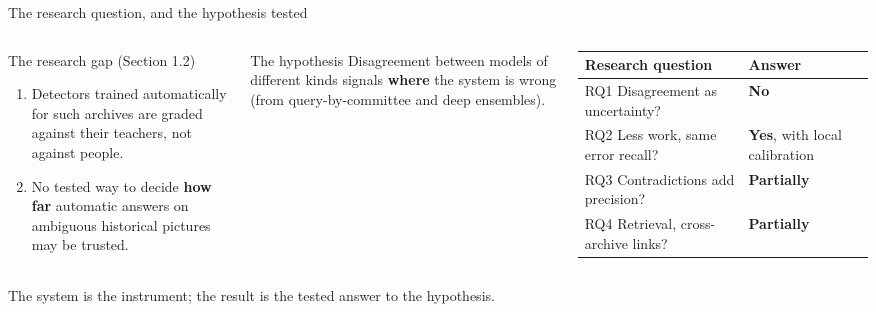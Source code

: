 \documentclass[aspectratio=169,10pt]{beamer}
\newcommand{\defboxfont}{\footnotesize}
\newcommand{\takeaway}[1]{\vfill\begin{keybox}#1\end{keybox}}
\newcommand{\yes}[1]{{\color{okc}\bfseries #1}}
\newcommand{\no}[1]{{\color{pers}\bfseries #1}}
\begin{document}
\begin{frame}{The research question, and the hypothesis tested}
\renewcommand{\defboxfont}{\scriptsize}
\begin{columns}[T,onlytextwidth]
\begin{defbox}{The research gap (Section 1.2)}
\begin{enumerate}\setlength\itemsep{1pt}
\item Detectors trained automatically for such archives are graded against their teachers, not against people.
\item No tested way to decide \textbf{how far} automatic answers on ambiguous historical pictures may be trusted.
\end{enumerate}
\end{defbox}
\begin{defbox}[colframe=risk,colbacktitle=riskbg,coltitle=risk]{The hypothesis}
Disagreement between models of different kinds signals \textbf{where} the system is wrong (from query-by-committee and deep ensembles).
\end{defbox}
\footnotesize
\renewcommand{\arraystretch}{1.35}
\begin{tabularx}{\linewidth}{@{}>{\raggedright\arraybackslash}X >{\raggedright\arraybackslash}m{2.0cm}@{}}
\toprule
\textbf{Research question} & \textbf{Answer}\\
\midrule
RQ1 \;Disagreement as uncertainty? & \no{No}\\
RQ2 \;Less work, same error recall? & \yes{Yes}, with local calibration\\
RQ3 \;Contradictions add precision? & {\color{risk}\textbf{Partially}}\\
RQ4 \;Retrieval, cross-archive links? & {\color{risk}\textbf{Partially}}\\
\bottomrule
\end{tabularx}
\end{columns}
\takeaway{The system is the instrument; the result is the tested answer to the hypothesis.}
\end{frame}
\end{document}
